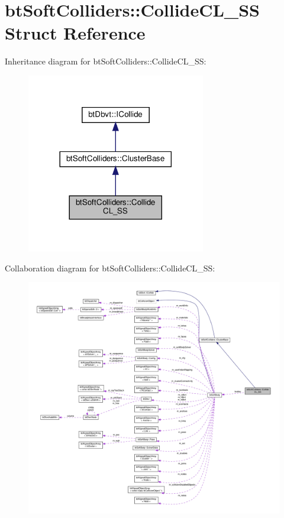 \hypertarget{structbtSoftColliders_1_1CollideCL__SS}{}\section{bt\+Soft\+Colliders\+:\+:Collide\+C\+L\+\_\+\+SS Struct Reference}
\label{structbtSoftColliders_1_1CollideCL__SS}


Inheritance diagram for bt\+Soft\+Colliders\+:\+:Collide\+C\+L\+\_\+\+SS\+:
\nopagebreak
\begin{figure}[H]
\begin{center}
\leavevmode
\includegraphics[width=221pt]{structbtSoftColliders_1_1CollideCL__SS__inherit__graph}
\end{center}
\end{figure}


Collaboration diagram for bt\+Soft\+Colliders\+:\+:Collide\+C\+L\+\_\+\+SS\+:
\nopagebreak
\begin{figure}[H]
\begin{center}
\leavevmode
\includegraphics[width=350pt]{structbtSoftColliders_1_1CollideCL__SS__coll__graph}
\end{center}
\end{figure}
